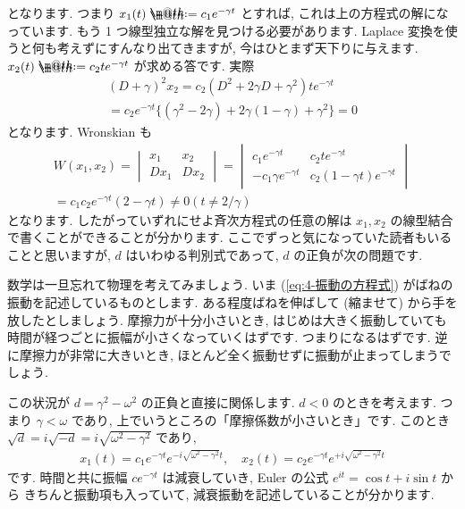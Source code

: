 \documentclass[openany, a4paper, oneside]{book}
\makeatletter
\newcommand*{\defeq}{\mathrel{\rlap{%
\raisebox{0.3ex}{$\m@th\cdot$}}%
\raisebox{-0.3ex}{$\m@th\cdot$}}%
=}
\theoremstyle{break}
\theoremstyle{breakdefn}
\makeatother
\begin{document}
となります.
つまり $x_1 (t) \defeq c_1 e^{- \gamma t}$ とすれば, これは上の方程式の解になっています.
もう 1 つ線型独立な解を見つける必要があります.
Laplace 変換を使うと何も考えずにすんなり出てきますが, 今はひとまず天下りに与えます.
$x_2 (t) \defeq c_2 t e^{- \gamma t}$ が求める答です.
実際
\begin{gather}
( D + \gamma ) ^2 x_2
=
c_2 ( D^2 + 2 \gamma D + \gamma ^2 ) t e^{- \gamma t} \\
=
c_2 e^{- \gamma t }\{ ( \gamma ^2 - 2 \gamma ) +  2 \gamma ( 1 - \gamma ) + \gamma ^2   \}
=
0
\end{gather}
となります.
Wronskian も
\begin{gather}
W (x_1, x_2)
=
\begin{vmatrix}
x_1 & x_2 \\
Dx_1 & Dx_2
\end{vmatrix}
=
\begin{vmatrix}
c_1 e^{ - \gamma t} & c_2 t e^{ - \gamma t} \\
-c_1 \gamma e^{ - \gamma t} & c_2 ( 1 - \gamma t ) e^{ - \gamma t}
\end{vmatrix} \\
=
c_1 c_2 e^{ - \gamma t} ( 2 - \gamma t )
\not=
0 (t\not = 2 / \gamma )
\end{gather}
となります.
したがっていずれにせよ斉次方程式の任意の解は $x_1,x_2$ の線型結合で書くことができることが分かります.
ここでずっと気になっていた読者もいることと思いますが,  $d$ はいわゆる判別式であって,
$d$ の正負が次の問題です.

数学は一旦忘れて物理を考えてみましょう.
いま (\ref{eq:4-振動の方程式}) がばねの振動を記述しているものとします.
ある程度ばねを伸ばして (縮ませて) から手を放したとしましょう.
摩擦力が十分小さいとき, はじめは大きく振動していても時間が経つごとに振幅が小さくなっていくはずです.
つまりになるはずです.
逆に摩擦力が非常に大きいとき, ほとんど全く振動せずに振動が止まってしまうでしょう.

この状況が $d = \gamma ^2 - \omega ^2$ の正負と直接に関係します.
$d<0$ のときを考えます.
つまり $\gamma < \omega$ であり, 上でいうところの「摩擦係数が小さいとき」です.
このとき $\sqrt{d} = i \sqrt{-d} = i \sqrt{\omega ^2 - \gamma ^2}$ であり,
\begin{gather}
x_1 (t)
=
c_1 e^{- \gamma t } e^{ - i \sqrt{\omega ^2 - \gamma ^2} t}
, \quad
x_2 (t)
=
c_2 e^{- \gamma t } e^{ + i \sqrt{\omega ^2 - \gamma ^2} t }
\end{gather}
です.
時間と共に振幅 $c e^{- \gamma t}$ は減衰していき,
Euler の公式 $e^{it}= \cos t + i \sin t$ から
きちんと振動項も入っていて,
減衰振動を記述していることが分かります.
\end{document}
